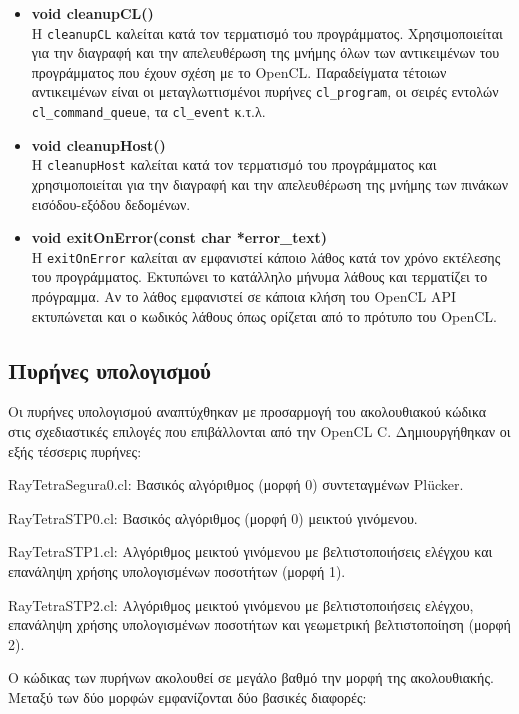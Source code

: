 \begin{itemize}
\item \textbf{void cleanupCL()}\\ 
Η \verb!cleanupCL! καλείται κατά τον τερματισμό του προγράμματος. Χρησιμοποιείται για την διαγραφή και την απελευθέρωση της μνήμης όλων των αντικειμένων του προγράμματος που έχουν σχέση με το OpenCL. Παραδείγματα τέτοιων αντικειμένων είναι οι μεταγλωττισμένοι πυρήνες \verb!cl_program!, οι σειρές εντολών \verb!cl_command_queue!, τα \verb!cl_event! κ.τ.λ. 


\item \textbf{void cleanupHost()}\\ 
H \verb!cleanupHost! καλείται κατά τον τερματισμό του προγράμματος και χρησιμοποιείται για την διαγραφή και την απελευθέρωση της μνήμης των πινάκων εισόδου-εξόδου δεδομένων.


\item \textbf{void exitOnError(const char *error\_text)}\\ 
Η \verb!exitOnError! καλείται αν εμφανιστεί κάποιο λάθος κατά τον χρόνο εκτέλεσης του προγράμματος. Εκτυπώνει το κατάλληλο μήνυμα λάθους και τερματίζει το πρόγραμμα. Αν το λάθος εμφανιστεί σε κάποια κλήση του OpenCL API εκτυπώνεται και ο κωδικός λάθους όπως ορίζεται από το πρότυπο του OpenCL.  

\end{itemize}

\subsection{Πυρήνες υπολογισμού} 

\noindent Οι πυρήνες υπολογισμού αναπτύχθηκαν με προσαρμογή του ακολουθιακού κώδικα στις σχεδιαστικές επιλογές που επιβάλλονται από την OpenCL C. Δημιουργήθηκαν οι εξής τέσσερις πυρήνες:
\begin{itemize*}
\item RayTetraSegura0.cl: Βασικός αλγόριθμος (μορφή 0) συντεταγμένων Plücker.
\item RayTetraSTP0.cl: Βασικός αλγόριθμος (μορφή 0) μεικτού γινόμενου.
\item RayTetraSTP1.cl: Αλγόριθμος μεικτού γινόμενου με βελτιστοποιήσεις ελέγχου και επανάληψη χρήσης υπολογισμένων ποσοτήτων (μορφή 1).
\item RayTetraSTP2.cl: Αλγόριθμος μεικτού γινόμενου με βελτιστοποιήσεις ελέγχου, επανάληψη χρήσης υπολογισμένων ποσοτήτων και γεωμετρική βελτιστοποίηση (μορφή 2).
\end{itemize*}
Ο κώδικας των πυρήνων ακολουθεί σε μεγάλο βαθμό την μορφή της ακολουθιακής. Μεταξύ των δύο μορφών εμφανίζονται δύο βασικές διαφορές: 

